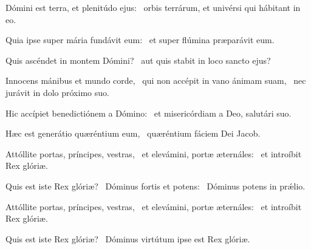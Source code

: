 \item Dómini est terra, et plenitúdo ejus:~\psstar{} orbis terrárum, et univérsi qui hábitant in eo.

\item Quia ipse super mária fundávit eum:~\psstar{} et super flúmina præparávit eum.

\item Quis ascéndet in montem Dómini?~\psstar{} aut quis stabit in loco sancto ejus?

\item Innocens mánibus et mundo corde,~\pscross{} qui non accépit in vano ánimam suam,~\psstar{} nec jurávit in dolo próximo suo.

\item Hic accípiet benedictiónem a Dómino:~\psstar{} et misericórdiam a Deo, salutári suo.

\item Hæc est generátio quæréntium eum,~\psstar{} quæréntium fáciem Dei Jacob.

\item Attóllite portas, príncipes, vestras,~\pscross{} et elevámini, portæ æternáles:~\psstar{} et introíbit Rex glóriæ.

\item Quis est iste Rex glóriæ?~\pscross{} Dóminus fortis et potens:~\psstar{} Dóminus potens in prǽlio.

\item Attóllite portas, príncipes, vestras,~\pscross{} et elevámini, portæ æternáles:~\psstar{} et introíbit Rex glóriæ.

\item Quis est iste Rex glóriæ?~\psstar{} Dóminus virtútum ipse est Rex glóriæ.

